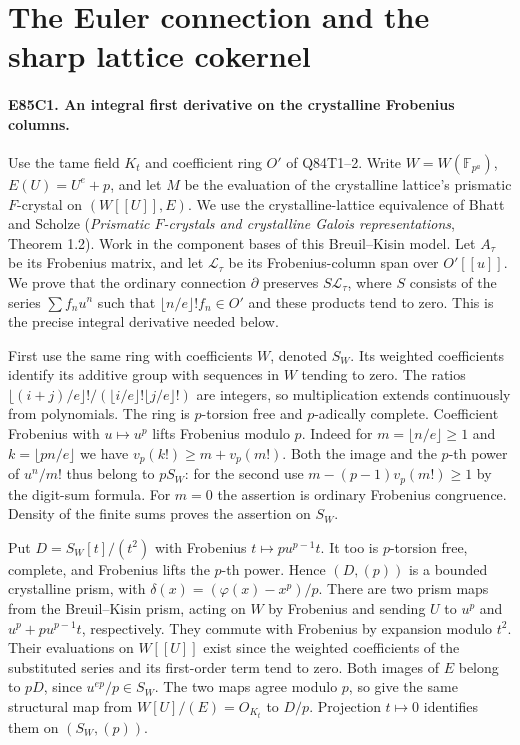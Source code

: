 \section{The Euler connection and the sharp lattice cokernel}

\paragraph{E85C1. An integral first derivative on the crystalline Frobenius columns.}
Use the tame field $K_t$ and coefficient ring $O'$ of Q84T1--2.
Write $W=W(\mathbb F_{p^a})$, $E(U)=U^e+p$, and let $M$ be the
evaluation of the crystalline lattice's prismatic $F$-crystal on
$(W[[U]],E)$. We use the crystalline-lattice equivalence of Bhatt and
Scholze (\emph{Prismatic $F$-crystals and crystalline Galois
representations}, Theorem 1.2). Work in the component bases of this
Breuil--Kisin model. Let $A_\tau$ be its Frobenius matrix, and let
$\mathcal L_\tau$ be its Frobenius-column span over $O'[[u]]$.
We prove that the ordinary connection $\partial$ preserves
$S\mathcal L_\tau$, where $S$ consists of the series $\sum f_nu^n$
such that $\lfloor n/e\rfloor! f_n\in O'$ and these products tend
to zero. This is the precise integral derivative needed below.

First use the same ring with coefficients $W$, denoted $S_W$. Its
weighted coefficients identify its additive group with sequences in
$W$ tending to zero. The ratios
$\lfloor (i+j)/e\rfloor!/(\lfloor i/e\rfloor!\lfloor j/e\rfloor!)$
are integers, so multiplication extends continuously from
polynomials. The ring is $p$-torsion free and $p$-adically complete.
Coefficient Frobenius with $u\mapsto u^p$ lifts Frobenius modulo $p$.
Indeed for $m=\lfloor n/e\rfloor\ge1$ and $k=\lfloor pn/e\rfloor$
we have $v_p(k!)\ge m+v_p(m!)$. Both the image and the $p$-th power
of $u^n/m!$ thus belong to $pS_W$: for the second use
$m-(p-1)v_p(m!)\ge1$ by the digit-sum formula. For $m=0$ the assertion
is ordinary Frobenius congruence. Density of the finite sums proves
the assertion on $S_W$.

Put $D=S_W[t]/(t^2)$ with Frobenius $t\mapsto pu^{p-1}t$.
It too is $p$-torsion free, complete, and Frobenius lifts the
$p$-th power. Hence $(D,(p))$ is a bounded crystalline prism,
with $\delta(x)=(\varphi(x)-x^p)/p$. There are two prism maps from
the Breuil--Kisin prism, acting on $W$ by Frobenius and sending
$U$ to $u^p$ and $u^p+pu^{p-1}t$, respectively. They commute with
Frobenius by expansion modulo $t^2$. Their evaluations on $W[[U]]$
exist since the weighted coefficients of the substituted series and
its first-order term tend to zero. Both images of $E$ belong to
$pD$, since $u^{ep}/p\in S_W$. The two maps agree modulo $p$,
so give the same structural map from $W[U]/(E)=O_{K_t}$ to $D/p$.
Projection $t\mapsto0$ identifies them on $(S_W,(p))$.

